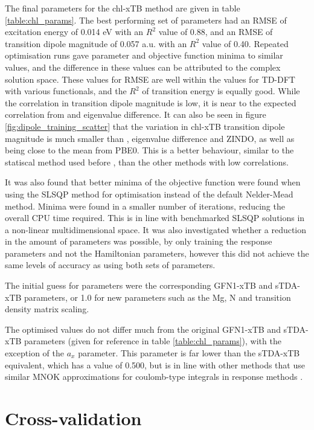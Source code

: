 The final parameters for the chl-xTB method are given in table \ref{table:chl_params}.
The best performing set of parameters had an RMSE of excitation energy of 0.014 eV 
with an $R^2$ value of 0.88, and an RMSE of transition dipole magnitude of 0.057 a.u. 
with an $R^2$ value of 0.40. Repeated optimisation runs gave parameter and objective
function minima to similar values, and the difference in these values can be attributed
to the complex solution space. These values for RMSE are well within the values
for TD-DFT with various functionals, and the $R^2$ of transition energy is equally
good. While the correlation in transition dipole magnitude is low, it is near to
the expected correlation from \dscf and eigenvalue difference. It can also be seen
in figure \ref{fig:dipole_training_scatter} that the variation in chl-xTB transition
dipole magnitude is much smaller than \dscf, eigenvalue difference and ZINDO, as
well as being close to the mean from PBE0. This is a better behaviour, similar to
the statiscal method used before \cite{Stross2016}, than the other methods with 
low correlations.

It was also found that better minima of the objective function were found when using
the SLSQP method for optimisation instead of the default Nelder-Mead method. Minima
were found in a smaller number of iterations, reducing the overall CPU time required.
This is in line with benchmarked SLSQP solutions in a non-linear multidimensional space.
It was also investigated whether a reduction in the amount of parameters was possible,
by only training the response parameters and not the Hamiltonian parameters, however 
this did not achieve the same levels of accuracy as using both sets of parameters.

The initial guess for parameters were the corresponding GFN1-xTB and sTDA-xTB
parameters, or 1.0 for new parameters such as the Mg, N and transition density matrix
scaling.

The optimised values do not differ much from the original GFN1-xTB and sTDA-xTB
parameters (given for reference in table \ref{table:chl_params}), with the exception
of the $a_x$ parameter. This parameter is far lower than the sTDA-xTB equivalent,
which has a value of 0.500, but is in line with other methods that use similar MNOK
approximations for coulomb-type integrals in response methods \cite{Cho2021}.

\afterpartskip
\section{Cross-validation}
\label{sec:chl_benchmarking}

